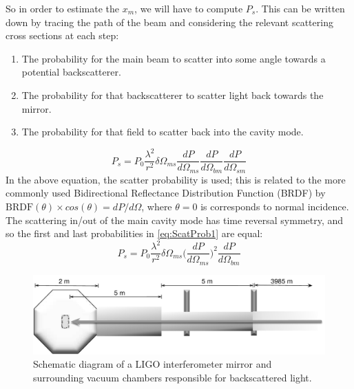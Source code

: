 So in order to estimate the $x_m$, we will have to compute $P_s$.
This can be written down by tracing the path of the beam and considering
the relevant scattering cross sections at each step:
\begin{enumerate}
\item The probability for the main beam to scatter into some angle towards a potential backscatterer.
\item The probability for that backscatterer to scatter light back towards the mirror.
\item The probability for that field to scatter back into the cavity mode.
\end{enumerate}
\begin{equation}
P_s = P_0 \frac{\lambda^2}{r^2} \delta \Omega_{ms} \frac{dP}{d\Omega_{ms}} \frac{dP}{d\Omega_{bm}} \frac{dP}{d\Omega_{sm}}
\label{eq:ScatProb1}
\end{equation}
In the above equation, the scatter probability is used; this is related to the
more commonly used Bidirectional Reflectance Distribution Function (BRDF) by
$ \mathrm{BRDF}(\theta) \times cos(\theta) = dP/d\Omega$, where $\theta = 0$ is
corresponds to normal incidence.
The scattering in/out of the main cavity mode has time reversal symmetry,
and so the first and last probabilities in \eqref{eq:ScatProb1} are equal:
\begin{equation}
P_s = P_0 \frac{\lambda^2}{r^2} \delta \Omega_{ms}
\bigg(\frac{dP}{d\Omega_{ms}}\bigg)^2 \frac{dP}{d\Omega_{bm}}
\label{eq:ScatProb2}
\end{equation}

\begin{figure}[h]
  \centering
    \includegraphics[width=\columnwidth]{Figures/ETM_scatter-BW.pdf}
    \caption{Schematic diagram of a LIGO interferometer mirror and
    surrounding vacuum chambers responsible for backscattered light.}
    \label{fig:ETMscat}
\end{figure}



